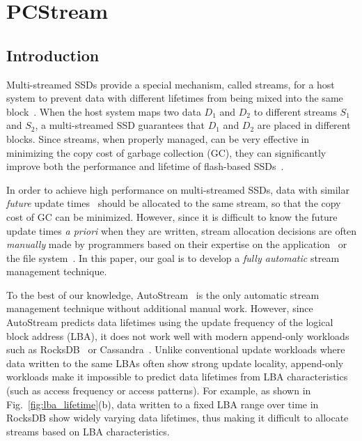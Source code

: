 \chapter{PCStream} 
\label{chap:PCstream}

\section{Introduction}
\label{sec:intro}
Multi-streamed SSDs provide a special mechanism,
called streams, for a host system to prevent data with different lifetimes 
from being mixed into the same block~\cite{T10, MultiStream}.
When the host system maps two data $D_1$ and $D_2$ to 
different streams $S_1$ and $S_2$, a multi-streamed SSD guarantees that 
$D_1$ and $D_2$ are placed in different blocks.   
Since streams, when properly managed, can be very effective in minimizing 
the copy cost of garbage collection (GC), they
can significantly improve both the performance and lifetime of 
flash-based SSDs~\cite{MultiStream, Level, FStream, AutoStream}.

In order to achieve high performance on multi-streamed SSDs, data with similar 
{\it future} update times~\cite{PCHa}
should be allocated 
to the same stream, so that the copy cost of GC can be minimized.
However, since it is difficult to know the future update times {\it a priori} when they are written,
stream allocation decisions are often {\it manually} made 
by programmers based on their expertise
on the application~\cite{MultiStream, Level} or the file system~\cite{FStream}.  
In this paper, our goal is to develop 
a {\it fully automatic} stream management technique. %

To the best of our knowledge, \textsf{\small AutoStream}~\cite{AutoStream} is the only automatic 
stream management technique
without additional manual work.  
However, since \textsf{\small AutoStream} predicts data lifetimes using the update frequency 
of the logical block address (LBA), it does not work well with modern append-only workloads 
such as RocksDB~\cite{RocksDB} or Cassandra~\cite{Cassandra}.  
Unlike conventional update workloads where data written to the same LBAs 
often show strong update locality, 
append-only workloads make it impossible to predict data lifetimes 
from LBA characteristics (such as access frequency or access patterns).  
For example, as shown in Fig.~\ref{fig:lba_lifetime}(b), 
data written to a fixed LBA range over time in RocksDB 
show widely varying data lifetimes, 
thus making it difficult to allocate streams based on LBA characteristics.

